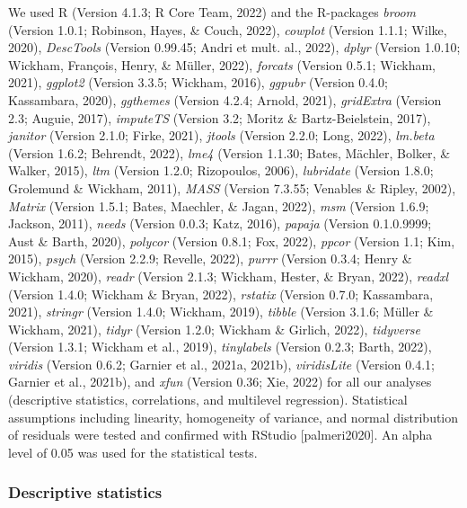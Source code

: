 \documentclass[
  man,floatsintext]{apa6}
\begin{document}
We used R (Version 4.1.3; R Core Team, 2022) and the R-packages \emph{broom} (Version 1.0.1; Robinson, Hayes, \& Couch, 2022), \emph{cowplot} (Version 1.1.1; Wilke, 2020), \emph{DescTools} (Version 0.99.45; Andri et mult. al., 2022), \emph{dplyr} (Version 1.0.10; Wickham, François, Henry, \& Müller, 2022), \emph{forcats} (Version 0.5.1; Wickham, 2021), \emph{ggplot2} (Version 3.3.5; Wickham, 2016), \emph{ggpubr} (Version 0.4.0; Kassambara, 2020), \emph{ggthemes} (Version 4.2.4; Arnold, 2021), \emph{gridExtra} (Version 2.3; Auguie, 2017), \emph{imputeTS} (Version 3.2; Moritz \& Bartz-Beielstein, 2017), \emph{janitor} (Version 2.1.0; Firke, 2021), \emph{jtools} (Version 2.2.0; Long, 2022), \emph{lm.beta} (Version 1.6.2; Behrendt, 2022), \emph{lme4} (Version 1.1.30; Bates, Mächler, Bolker, \& Walker, 2015), \emph{ltm} (Version 1.2.0; Rizopoulos, 2006), \emph{lubridate} (Version 1.8.0; Grolemund \& Wickham, 2011), \emph{MASS} (Version 7.3.55; Venables \& Ripley, 2002), \emph{Matrix} (Version 1.5.1; Bates, Maechler, \& Jagan, 2022), \emph{msm} (Version 1.6.9; Jackson, 2011), \emph{needs} (Version 0.0.3; Katz, 2016), \emph{papaja} (Version 0.1.0.9999; Aust \& Barth, 2020), \emph{polycor} (Version 0.8.1; Fox, 2022), \emph{ppcor} (Version 1.1; Kim, 2015), \emph{psych} (Version 2.2.9; Revelle, 2022), \emph{purrr} (Version 0.3.4; Henry \& Wickham, 2020), \emph{readr} (Version 2.1.3; Wickham, Hester, \& Bryan, 2022), \emph{readxl} (Version 1.4.0; Wickham \& Bryan, 2022), \emph{rstatix} (Version 0.7.0; Kassambara, 2021), \emph{stringr} (Version 1.4.0; Wickham, 2019), \emph{tibble} (Version 3.1.6; Müller \& Wickham, 2021), \emph{tidyr} (Version 1.2.0; Wickham \& Girlich, 2022), \emph{tidyverse} (Version 1.3.1; Wickham et al., 2019), \emph{tinylabels} (Version 0.2.3; Barth, 2022), \emph{viridis} (Version 0.6.2; Garnier et al., 2021a, 2021b), \emph{viridisLite} (Version 0.4.1; Garnier et al., 2021b), and \emph{xfun} (Version 0.36; Xie, 2022) for all our analyses (descriptive statistics, correlations, and multilevel regression). Statistical assumptions including linearity, homogeneity of variance, and normal distribution of residuals were tested and confirmed with RStudio {[}palmeri2020{]}. An alpha level of 0.05 was used for the statistical tests.

\hypertarget{descriptive-statistics}{%
\subsubsection{Descriptive statistics}\label{descriptive-statistics}}
\end{document}

